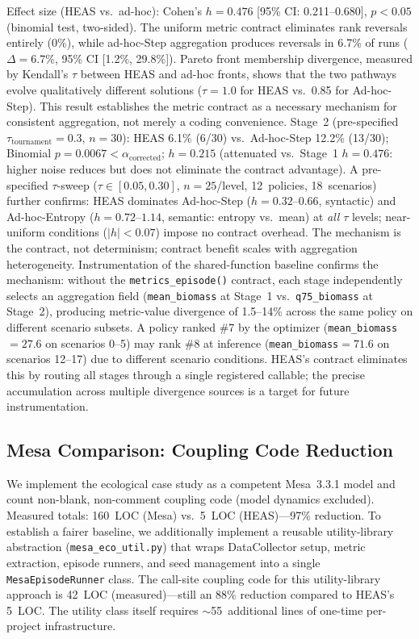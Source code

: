 \documentclass{wscpaperproc}
\begin{document}
Effect size (HEAS vs.\ ad-hoc): Cohen's $h = 0.476$ [95\% CI: 0.211--0.680],
$p < 0.05$ (binomial test, two-sided). The uniform metric contract eliminates
rank reversals entirely (0\%), while ad-hoc-Step aggregation produces reversals in 6.7\%
of runs ($\Delta = 6.7\%$, 95\% CI [1.2\%, 29.8\%]). Pareto front membership divergence,
measured by Kendall's $\tau$ between HEAS and ad-hoc fronts, shows that the two
pathways evolve qualitatively different solutions ($\tau = 1.0$ for HEAS vs.\ 0.85 for
Ad-hoc-Step). This result establishes the metric contract as a necessary mechanism for consistent
aggregation, not merely a coding convenience. Stage~2 (pre-specified $\tau_\text{tournament}\!=\!0.3$, $n\!=\!30$): HEAS 6.1\% (6/30)
vs.\ Ad-hoc-Step 12.2\% (13/30); Binomial $p\!=\!0.0067 < \alpha_\text{corrected}$;
$h\!=\!0.215$ (attenuated vs.\ Stage~1 $h\!=\!0.476$: higher noise reduces but does
not eliminate the contract advantage). A pre-specified $\tau$-sweep ($\tau \in [0.05,
0.30]$, $n\!=\!25$/level, 12~policies, 18~scenarios) further confirms: HEAS dominates
Ad-hoc-Step ($h\!=\!0.32$--$0.66$, syntactic) and Ad-hoc-Entropy ($h\!=\!0.72$--$1.14$,
semantic: entropy vs.\ mean) at \emph{all} $\tau$ levels; near-uniform conditions
($|h|\!<\!0.07$) impose no contract overhead. The mechanism is the contract, not
determinism; contract benefit scales with aggregation heterogeneity.
Instrumentation of the shared-function baseline confirms the mechanism:
without the \texttt{metrics\_episode()} contract, each stage independently
selects an aggregation field (\texttt{mean\_biomass} at Stage~1 vs.\
\texttt{q75\_biomass} at Stage~2), producing metric-value divergence of
1.5--14\% across the same policy on different scenario subsets. A policy
ranked \#7 by the optimizer (\texttt{mean\_biomass}$\!=\!27.6$ on
scenarios 0--5) may rank \#8 at inference (\texttt{mean\_biomass}$\!=\!71.6$
on scenarios 12--17) due to different scenario conditions. HEAS's
contract eliminates this by routing all stages through a single registered
callable; the precise accumulation across multiple divergence sources is
a target for future instrumentation.

\subsection{Mesa Comparison: Coupling Code Reduction}
\label{sec:mesa-comparison}

We implement the ecological case study as a competent Mesa~3.3.1 model and
count non-blank, non-comment coupling code (model dynamics excluded).
Measured totals: 160~LOC (Mesa) vs.\ 5~LOC (HEAS)---97\% reduction.
To establish a fairer baseline, we additionally implement a reusable
utility-library abstraction (\texttt{mesa\_eco\_util.py}) that wraps
DataCollector setup, metric extraction, episode runners, and seed management
into a single \texttt{MesaEpisodeRunner} class. The call-site coupling code
for this utility-library approach is 42~LOC (measured)---still an 88\%
reduction compared to HEAS's 5~LOC. The utility class itself requires
$\sim$55~additional lines of one-time per-project infrastructure.
\end{document}

